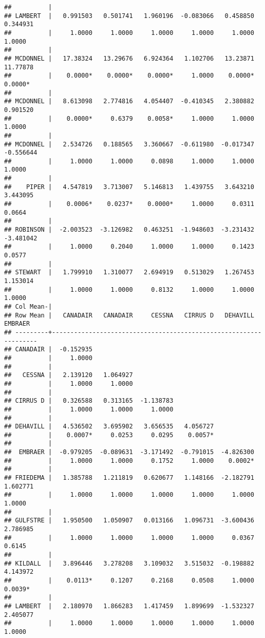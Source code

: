 \documentclass[
]{article}
\begin{document}
\begin{verbatim}
##          |
## LAMBERT  |   0.991503   0.501741   1.960196  -0.083066   0.458850   0.344931
##          |     1.0000     1.0000     1.0000     1.0000     1.0000     1.0000
##          |
## MCDONNEL |   17.38324   13.29676   6.924364   1.102706   13.23871   11.77878
##          |    0.0000*    0.0000*    0.0000*     1.0000    0.0000*    0.0000*
##          |
## MCDONNEL |   8.613098   2.774816   4.054407  -0.410345   2.380882   0.901520
##          |    0.0000*     0.6379    0.0058*     1.0000     1.0000     1.0000
##          |
## MCDONNEL |   2.534726   0.188565   3.360667  -0.611980  -0.017347  -0.556644
##          |     1.0000     1.0000     0.0898     1.0000     1.0000     1.0000
##          |
##    PIPER |   4.547819   3.713007   5.146813   1.439755   3.643210   3.443095
##          |    0.0006*    0.0237*    0.0000*     1.0000     0.0311     0.0664
##          |
## ROBINSON |  -2.003523  -3.126982   0.463251  -1.948603  -3.231432  -3.481042
##          |     1.0000     0.2040     1.0000     1.0000     0.1423     0.0577
##          |
## STEWART  |   1.799910   1.310077   2.694919   0.513029   1.267453   1.153014
##          |     1.0000     1.0000     0.8132     1.0000     1.0000     1.0000
## Col Mean-|
## Row Mean |   CANADAIR   CANADAIR     CESSNA   CIRRUS D   DEHAVILL    EMBRAER
## ---------+------------------------------------------------------------------
## CANADAIR |  -0.152935
##          |     1.0000
##          |
##   CESSNA |   2.139120   1.064927
##          |     1.0000     1.0000
##          |
## CIRRUS D |   0.326588   0.313165  -1.138783
##          |     1.0000     1.0000     1.0000
##          |
## DEHAVILL |   4.536502   3.695902   3.656535   4.056727
##          |    0.0007*     0.0253     0.0295    0.0057*
##          |
##  EMBRAER |  -0.979205  -0.089631  -3.171492  -0.791015  -4.826300
##          |     1.0000     1.0000     0.1752     1.0000    0.0002*
##          |
## FRIEDEMA |   1.385788   1.211819   0.620677   1.148166  -2.182791   1.602771
##          |     1.0000     1.0000     1.0000     1.0000     1.0000     1.0000
##          |
## GULFSTRE |   1.950500   1.050907   0.013166   1.096731  -3.600436   2.786985
##          |     1.0000     1.0000     1.0000     1.0000     0.0367     0.6145
##          |
## KILDALL  |   3.896446   3.278208   3.109032   3.515032  -0.198882   4.143972
##          |    0.0113*     0.1207     0.2168     0.0508     1.0000    0.0039*
##          |
## LAMBERT  |   2.180970   1.866283   1.417459   1.899699  -1.532327   2.405077
##          |     1.0000     1.0000     1.0000     1.0000     1.0000     1.0000

\end{verbatim}
\end{document}
